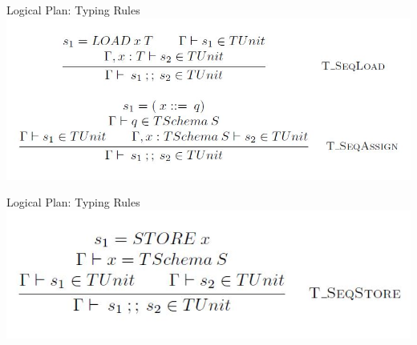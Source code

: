 \begin{frame}{Logical Plan: Typing Rules}
\centering
%
\includegraphics[scale=0.5]{Images/TypingRules/SEQ1.JPG}
\end{frame}

\begin{frame}{Logical Plan: Typing Rules}
\centering
\includegraphics[scale=0.5]{Images/TypingRules/SEQ2.JPG}
\end{frame}


